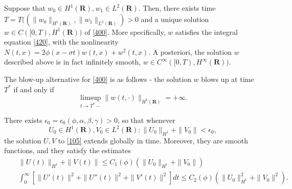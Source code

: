\documentclass[10pt,a4paper]{amsart}
\newcommand{\al}{\alpha}
\newcommand{\be}{\beta}
\newcommand{\eps}{\epsilon}
\newcommand{\ga}{\gamma}
\newcommand{\rone}{\mathbf R}
\newcommand{\si}{\sigma}
\begin{document}
\begin{proposition}
	\label{prop:54} 
	Suppose that $w_0\in H^1(\rone), w_1\in L^2(\rone)$. Then, there exists time \\  $T=T((\|w_0\|_{H^1(\rone)}, \|w_1\|_{L^2(\rone)})>0$ and a unique solution 
	$w\in C([0,T), H^1(\rone))$ of \eqref{400}. More specifically, $w$ satisfies the integral equation \eqref{420}, with the nonlinearity $N(t,x)=2\phi(x-\si t)w(t,x) +w^2(t,x)$. 
	A posteriori, the solution $w$ described above is in fact infinitely smooth, $w\in C^\infty([0,T), H^\infty(\rone))$. 
	
	The blow-up alternative for \eqref{400} is as follows - the solution $w$ blows up at time $T^*$ if and only if 
	\begin{equation}
		\label{90P}
		\limsup_{t\to T^*-} \|w(t, \cdot)\|_{H^1(\rone)}=+\infty. 
	\end{equation}
\end{proposition}

\begin{proposition}
	\label{prop:65} 
There exists $\eps_0=\eps_0(\phi, \al, \be, \ga)>0$, so that whenever 
\begin{equation}
	\label{297} 
	U_0\in H^1(\rone), V_0\in L^2(\rone):  \|U_0\|_{H^1}+\|V_0\|<\eps_0, 
\end{equation}
the solution $U,V$ to \eqref{105} extends globally in time. Moreover, they are smooth functions, and they satisfy the estimates 
\begin{eqnarray}
	\label{w:10} 
& & 	\|U(t)\|_{H^1}+ \|V(t)\|\leq C_1(\phi) (\|U_0\|_{H^1}+\|V_0\|) \\
		\label{w:20}
	& & 	\int_0^\infty  [\|U'(t)\|^2+ \|U''(t)\|^2+\|V'(t)\|^2]dt\leq C_2(\phi) (\|U_0\|_{H^1}^2+\|V_0\|^2). 
\end{eqnarray}
\end{proposition}
\end{document}

